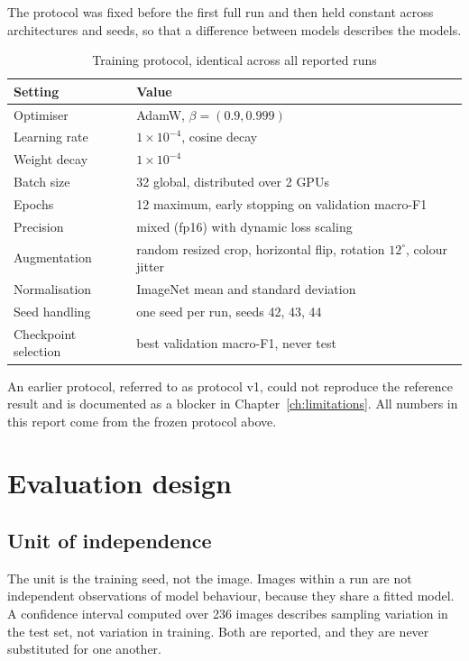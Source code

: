 The protocol was fixed before the first full run and then held constant across
architectures and seeds, so that a difference between models describes the models.

\begin{table}[H]
\centering
\caption{Training protocol, identical across all reported runs}
\label{tab:protocol}
\tabfont
\begin{tabularx}{\textwidth}{@{}lY@{}}
\toprule
\textbf{Setting} & \textbf{Value} \\
\midrule
Optimiser & AdamW, $\beta = (0.9, 0.999)$ \\
Learning rate & $1\times10^{-4}$, cosine decay \\
Weight decay & $1\times10^{-4}$ \\
Batch size & 32 global, distributed over 2 GPUs \\
Epochs & 12 maximum, early stopping on validation macro-F1 \\
Precision & mixed (fp16) with dynamic loss scaling \\
Augmentation & random resized crop, horizontal flip, rotation $12^\circ$, colour jitter \\
Normalisation & ImageNet mean and standard deviation \\
Seed handling & one seed per run, seeds 42, 43, 44 \\
Checkpoint selection & best validation macro-F1, never test \\
\bottomrule
\end{tabularx}
\end{table}

An earlier protocol, referred to as protocol v1, could not reproduce the reference
result and is documented as a blocker in Chapter~\ref{ch:limitations}. All numbers in
this report come from the frozen protocol above.

\section{Evaluation design}

\subsection{Unit of independence}

The unit is the training seed, not the image. Images within a run are not
independent observations of model behaviour, because they share a fitted model. A
confidence interval computed over 236 images describes sampling variation in the
test set, not variation in training. Both are reported, and they are never
substituted for one another.

